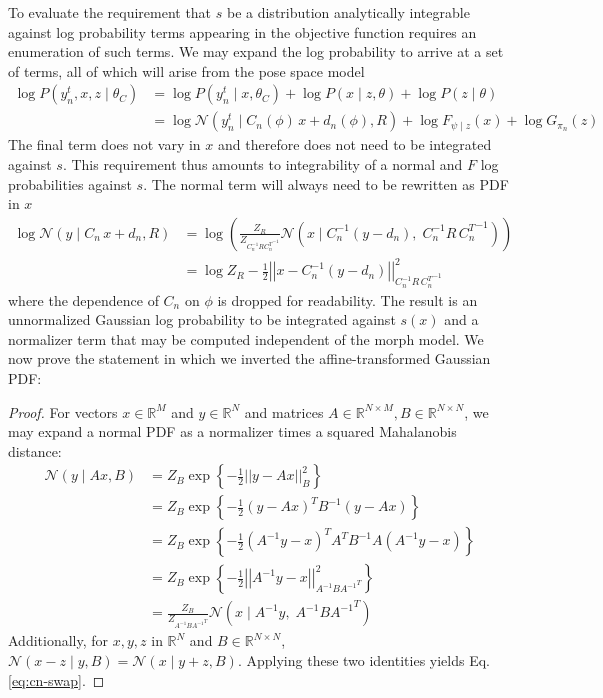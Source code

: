 \documentclass{article}         %
\newcommand{\inv}{^{-1}}
\newcommand{\RR}{\mathbb{R}}
\newcommand{\NN}{\mathcal{N}}
\newcommand{\norm}[1]{\left|\left| #1 \right|\right|}
\newcommand{\cb}[1]{\left\{ #1 \right\}}
\newcommand{\pn}[1]{\left( #1 \right)}
\begin{document}
To evaluate the requirement that $s$ be a distribution analytically integrable against log probability terms appearing in the objective function requires an enumeration of such terms. We may expand the log probability to arrive at a set of terms, all of which will arise from the pose space model
\begin{align}
    \log P(y^t_n, x, z \mid \theta_C) &= \log P(y^t_n \mid x, \theta_C) + \log P(x\mid z, \theta) + \log P(z\mid \theta) \\
    &= \log \NN(y^t_n \mid C_n(\phi)\, x + d_n(\phi), R) + \log F_{\psi\mid z}(x) + \log G_{\pi_n}(z)
    \label{eq:logprob-terms}
\end{align}
The final term does not vary in $x$ and therefore does not need to be integrated against $s$. This requirement thus amounts to integrability of a normal and $F$ log probabilities against $s$. The normal term will always need to be rewritten as PDF in $x$
\begin{align}
    \log \NN(y\mid C_n\, x + d_n, R) &= \log\pn{\frac{Z_{R}}{Z_{C_n\inv R {C_n^T}\inv}} \NN\pn{x\mid C_n\inv \pn{y - d_n},\; C_n\inv R\, {C_n^T}\inv}} \\ &= \log Z_{R} - \frac{1}{2}\norm{x - C_n\inv (y - d_n)}^2_{C_n\inv R\, {C_n^T}\inv}
    \label{eq:cn-swap}
\end{align}
where the dependence of $C_n$ on $\phi$ is dropped for readability. The result is an unnormalized Gaussian log probability to be integrated against $s(x)$ and a normalizer term that may be computed independent of the morph model. We now prove the statement in which we inverted the affine-transformed Gaussian PDF:
\begin{proof} For vectors $x\in \RR^M$ and $y\in \RR^N$ and matrices $A\in \RR^{N\times M}, B\in \RR^{N\times N}$, we may expand a normal PDF as a normalizer times a squared Mahalanobis distance:
    \begin{align}
        \NN(y\mid Ax, B) &= Z_{B} \exp\cb{-\frac{1}{2}\norm{y - Ax}^2_{B}} \\
        &= Z_{B} \exp\cb{-\frac{1}{2}(y - Ax)^TB\inv(y - Ax)} \\
        &= Z_{B} \exp\cb{-\frac{1}{2}(A\inv y - x)^TA^TB\inv A(A\inv y - x)} \\
        &= Z_{B} \exp\cb{-\frac{1}{2}\norm{A\inv y - x}^2_{A\inv B{A\inv}^T}} \\
        &= \frac{Z_{B}}{Z_{A\inv B{A\inv}^T}} \NN\pn{x\mid A\inv y, \; A\inv B{A\inv}^T}
    \end{align}
Additionally, for $x,y,z$ in $\RR^N$ and $B\in\RR^{N\times N}$, $\NN(x - z \mid y, B) = \NN(x \mid y+z, B)$. Applying these two identities yields Eq. \ref{eq:cn-swap}.
\end{proof}
\end{document}
